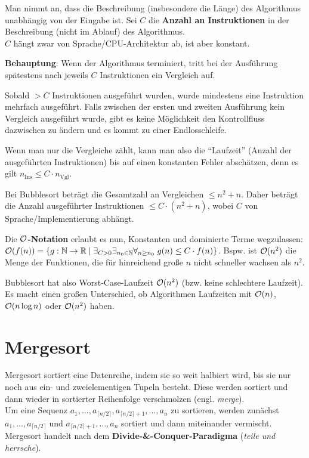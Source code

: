 Man nimmt an, dass die Beschreibung (insbesondere die Länge) des Algorithmus
unabhängig von der Eingabe ist.
Sei $C$ die \textbf{Anzahl an Instruktionen} in der Beschreibung
(nicht im Ablauf) des Algorithmus. \\
$C$ hängt zwar von Sprache/CPU-Architektur ab, ist aber konstant.

\textbf{Behauptung}: Wenn der Algorithmus terminiert, tritt bei der Ausführung
spätestens nach jeweils $C$ Instruktionen ein Vergleich auf.

\begin{Beweis}
    Sobald $> C$ Instruktionen ausgeführt wurden, wurde mindestens
    eine Instruktion mehrfach ausgeführt.
    Falls zwischen der ersten und zweiten Ausführung kein Vergleich ausgeführt
    wurde, gibt es keine Möglichkeit den Kontrollfluss dazwischen zu ändern
    und es kommt zu einer Endlosschleife.
\end{Beweis}

Wenn man nur die Vergleiche zählt, kann man also die "`Laufzeit"' (Anzahl der
ausgeführten Instruktionen) bis auf einen konstanten Fehler abschätzen, denn
es gilt $n_{\text{Ins}} \le C \cdot n_{\text{Vgl}}$.

\linie

Bei Bubblesort beträgt die Gesamtzahl an Vergleichen $\le n^2 + n$.
Daher beträgt die Anzahl ausgeführter Instruktionen $\le C \cdot (n^2 + n)$,
wobei $C$ von Sprache/Implementierung abhängt.

Die \textbf{$\mathcal{O}$-Notation} erlaubt es nun, Konstanten und dominierte Terme
wegzulassen: \\
$\mathcal{O}(f(n)) = \{g: \mathbb{N} \rightarrow \mathbb{R} \;|\;
\exists_{C > 0} \exists_{n_0 \in \mathbb{N}} \forall_{n \ge n_0}\;
g(n) \le C \cdot f(n)\}$.
Bspw. ist $\mathcal{O}(n^2)$ die Menge der Funktionen, die für hinreichend große $n$
nicht schneller wachsen als $n^2$.

Bubblesort hat also Worst-Case-Laufzeit $\mathcal{O}(n^2)$
(bzw. keine schlechtere Laufzeit).
Es macht einen großen Unterschied, ob Algorithmen Laufzeiten mit
$\mathcal{O}(n)$, $\mathcal{O}(n \log n)$ oder $\mathcal{O}(n^2)$ haben.

\section{%
    Mergesort%
}

Mergesort sortiert eine Datenreihe, indem sie so weit halbiert wird, bis sie
nur noch aus ein- und zweielementigen Tupeln besteht.
Diese werden sortiert und dann wieder in sortierter Reihenfolge verschmolzen
(engl. \emph{merge}). \\
Um eine Sequenz $a_1, \ldots, a_{\lceil n/2 \rceil},
a_{\lceil n/2 \rceil + 1}, \ldots, a_n$ zu sortieren, werden zunächst
$a_1, \ldots, a_{\lceil n/2 \rceil}$ und
$a_{\lceil n/2 \rceil + 1}, \ldots, a_n$ sortiert und dann miteinander
vermischt. \\
Mergesort handelt nach dem \textbf{Divide-\&-Conquer-Paradigma}
(\emph{teile und herrsche}).

